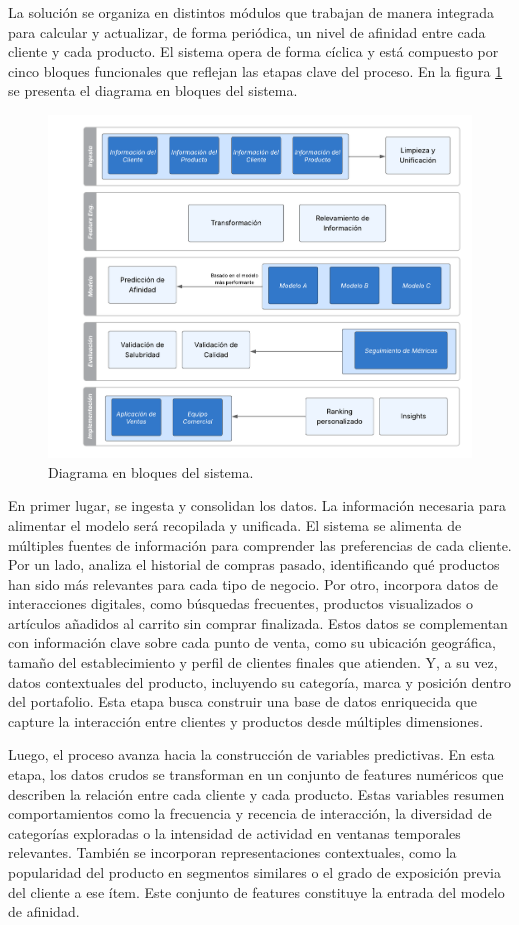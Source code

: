 \documentclass[
11pt, %
]{charter}
\begin{document}
La solución se organiza en distintos módulos que trabajan de manera integrada para calcular y actualizar, de forma periódica, un nivel de afinidad entre cada cliente y cada producto. El sistema opera de forma cíclica y está compuesto por cinco bloques funcionales que reflejan las etapas clave del proceso. En la figura \ref{fig:diagBloques} se presenta el diagrama en bloques del sistema. 

\begin{figure}[htpb]
\centering 
\includegraphics[width=.65\textwidth]{./Figuras/diagBloques.png}
\caption{Diagrama en bloques del sistema.}
\label{fig:diagBloques}
\end{figure}

En primer lugar, se ingesta y consolidan los datos. La información necesaria para alimentar el modelo será recopilada y unificada. El sistema se alimenta de múltiples fuentes de información para comprender las preferencias de cada cliente. Por un lado, analiza el historial de compras pasado, identificando qué productos han sido más relevantes para cada tipo de negocio. Por otro, incorpora datos de interacciones digitales, como búsquedas frecuentes, productos visualizados o artículos añadidos al carrito sin comprar finalizada. Estos datos se complementan con información clave sobre cada punto de venta, como su ubicación geográfica, tamaño del establecimiento y perfil de clientes finales que atienden. Y, a su vez, datos contextuales del producto, incluyendo su categoría, marca y posición dentro del portafolio. Esta etapa busca construir una base de datos enriquecida que capture la interacción entre clientes y productos desde múltiples dimensiones.

Luego, el proceso avanza hacia la construcción de variables predictivas. En esta etapa, los datos crudos se transforman en un conjunto de features numéricos que describen la relación entre cada cliente y cada producto. Estas variables resumen comportamientos como la frecuencia y recencia de interacción, la diversidad de categorías exploradas o la intensidad de actividad en ventanas temporales relevantes. También se incorporan representaciones contextuales, como la popularidad del producto en segmentos similares o el grado de exposición previa del cliente a ese ítem. Este conjunto de features constituye la entrada del modelo de afinidad.
\end{document}
